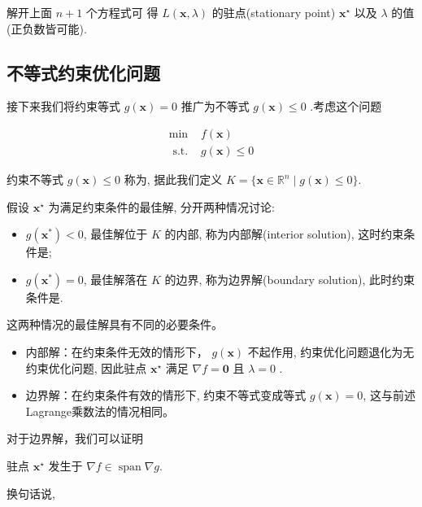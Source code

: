 解开上面 $ n+1 $ 个方程式可 得 $ L(\mathbf{x}, \lambda) $ 的驻点(stationary point) $ \mathbf{x}^{\star} $ 以及 $ \lambda $ 的值(正负数皆可能).

\subsection{不等式约束优化问题}

接下来我们将约束等式 $ g(\mathbf{x})=0 $ 推广为不等式 $ g(\mathbf{x}) \leq 0 $ .考虑这个问题

\begin{problem}[不等式约束优化问题]

$$
\begin{array}{ll}
\min & f(\mathbf{x}) \\
\text { s.t. } & g(\mathbf{x}) \leq 0
\end{array}
$$

约束不等式 $ g(\mathbf{x}) \leq 0 $ 称为, 据此我们定义 $ K=\{ \mathbf{x} \in \mathbb{R}^{n} \mid g(\mathbf{x}) \leq 0 \}$.
\end{problem}

假设 $ \mathbf{x}^{\star} $ 为满足约束条件的最佳解, 分开两种情况讨论:

\begin{itemize}
    \item $ g\left(\mathbf{x}^{*}\right)<0 $, 最佳解位于 $ K $ 的内部, 称为内部解(interior solution), 这时约束条件是;
    \item $ g\left(\mathbf{x}^{*}\right)=0 $, 最佳解落在 $ K $ 的边界, 称为边界解(boundary solution), 此时约束条件是.
\end{itemize}

这两种情况的最佳解具有不同的必要条件。

\begin{itemize}
    \item 内部解：在约束条件无效的情形下， $ g(\mathbf{x}) $ 不起作用, 约束优化问题退化为无约束优化问题, 因此驻点 $ \mathbf{x}^{\star} $ 满足 $ \nabla f=\mathbf{0} $ 且 $ \lambda=0 $ .
    \item 边界解：在约束条件有效的情形下, 约束不等式变成等式 $g(\mathbf{x})=0$, 这与前述Lagrange乘数法的情况相同。
\end{itemize}

对于边界解，我们可以证明

\begin{theorem}
    驻点 $\mathbf{x}^{\star}$ 发生于 $\nabla f \in \operatorname{span} \nabla g$.
\end{theorem}
换句话说, 

